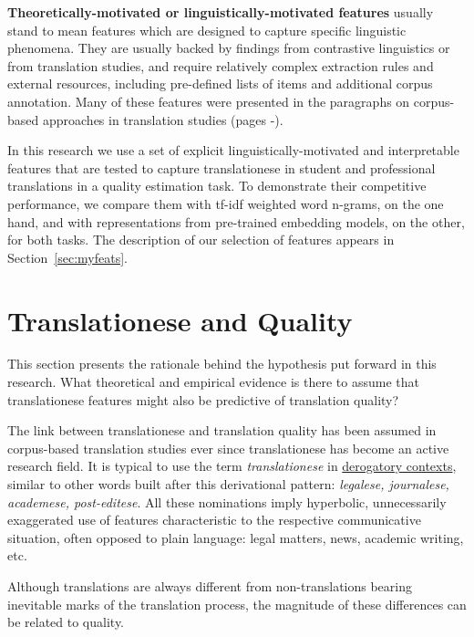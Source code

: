 \textbf{Theoretically-motivated or linguistically-motivated features} usually stand to mean features which are designed to capture specific linguistic phenomena. They are usually backed by findings from contrastive linguistics or from translation studies, and require relatively complex extraction rules and external resources, including pre-defined lists of items and additional corpus annotation. Many of these features were presented in the paragraphs on corpus-based approaches in translation studies (pages \pageref{pg:coling_begin}-\pageref{pg:coling_end}).

In this research we use a set of explicit linguistically-motivated and interpretable features that are tested to capture translationese in student and professional translations in a quality estimation task. 
To demonstrate their competitive performance, we compare them with \gls{tf-idf} weighted word n-grams, on the one hand, and with representations from pre-trained embedding models, on the other, for both tasks. The description of our selection of features appears in Section~\ref{sec:myfeats}.

\section{\label{sec:feats4qua}Translationese and Quality}
This section presents the rationale behind the hypothesis put forward in this research. What theoretical and empirical evidence is there to assume that translationese features might also be predictive of translation quality? 
 
The link between translationese and translation quality has been assumed in corpus-based translation studies ever since translationese has become an active research field. It is typical to use the term \textit{translationese} in \hyperlink{wd:evaluative}{derogatory contexts}, similar to other words built after this derivational pattern: \textit{legalese, journalese, academese, post-editese}. All these nominations imply hyperbolic, unnecessarily exaggerated use of features characteristic to the respective communicative situation, often opposed to plain language: legal matters, news, academic writing, etc. %

Although translations are always different from non-translations bearing inevitable marks of the translation process, the magnitude of these differences can be related to quality.

